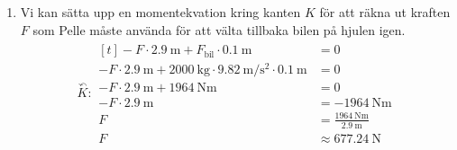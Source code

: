 \documentclass[11pt]{article}
\begin{document}
\begin{enumerate}[itemsep=2em]
              \newpage
        \item
              Vi kan sätta upp en momentekvation kring kanten $K$ för att räkna ut kraften $F$ som Pelle måste använda för att välta tillbaka bilen på hjulen igen.
              \begin{align*}
                      \overset{\curvearrowleft}{K} : \begin{aligned}[t]
                                                             -F \cdot \SI{2.9}{\meter} + F_{\text{bil}} \cdot \SI{0.1}{\meter}                                                 & = 0                                                  \\
                                                             -F \cdot \SI{2.9}{\meter} + \SI{2 000}{\kilo\gram} \cdot \SI{9.82}{\meter/\second\squared} \cdot \SI{0.1}{\meter} & = 0                                                  \\
                                                             -F \cdot \SI{2.9}{\meter} + \SI{1 964}{\newton\meter}                                                             & = 0                                                  \\
                                                             -F \cdot \SI{2.9}{\meter}                                                                                         & = -\SI{1 964}{\newton\meter}                         \\
                                                             F                                                                                                                 & = \frac{\SI{1 964}{\newton\meter}}{\SI{2.9}{\meter}} \\
                                                             F                                                                                                                 & \approx \SI{677.24}{\newton}
                                                     \end{aligned}
              \end{align*}
              \begin{center}
                      
              \end{center}




\end{enumerate}
\vfill
\begin{center}
\end{center}
\end{document}

